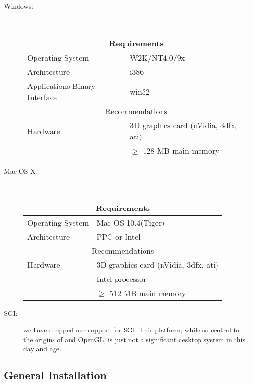 \begin{description}
    \item [Windows: ] \mbox{}\\
          \begin{center}
          \begin{tabular}{|l|l|} \hline
            \multicolumn{2}{|c|}{Requirements} \\ \hline
              Operating System & W2K/NT4.0/9x\\
              Architecture & i386\\
              Applications Binary Interface  &  win32 \\
              \hline
            \multicolumn{2}{|c|}{Recommendations} \\ \hline
            Hardware & 3D graphics card (nVidia, 3dfx, ati)\\
            & $\ge$ 128 MB main memory \\ \hline
          \end{tabular}
          \end{center}

    \item [Mac OS X: ] \mbox{}\\
          \begin{center}
          \begin{tabular}{|l|l|} \hline
            \multicolumn{2}{|c|}{Requirements} \\ \hline
              Operating System & Mac OS 10.4(Tiger)\\
              Architecture & PPC or Intel\\
              \hline
            \multicolumn{2}{|c|}{Recommendations} \\ \hline
            Hardware & 3D graphics card (nVidia, 3dfx, ati)\\
            & Intel processor \\
            & $\ge$ 512 MB main memory \\ \hline
          \end{tabular}
          \end{center}
          
   \item [SGI: ] we have dropped our support for SGI.  This platform, while
     so central to the origins of \map{} and OpenGL, is just not a
     significant desktop system in this day and age.  

  \end{description}
  
\subsection{General Installation}

